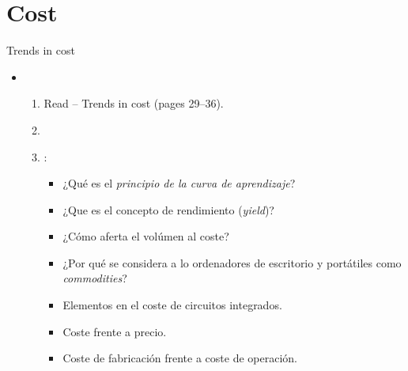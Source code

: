\section{Cost}

\begin{frame}[t]{Trends in cost}
\begin{itemize}
  \item {}
    \begin{enumerate}
      \item Read  -- Trends in cost (pages 29--36).
        \item \bibhennessy

      \item {}:
        \begin{itemize}
          \item ¿Qué es el \emph{principio de la curva de aprendizaje}?
          \item ¿Que es el concepto de rendimiento (\emph{yield})?
          \item ¿Cómo aferta el volúmen al coste?
          \item ¿Por qué se considera a lo ordenadores de escritorio y portátiles como
                \emph{commodities}?
          \item Elementos en el coste de circuitos integrados.
          \item Coste frente a precio.
          \item Coste de fabricación frente a coste de operación.
        \end{itemize}
    \end{enumerate}
\end{itemize}
\end{frame}
